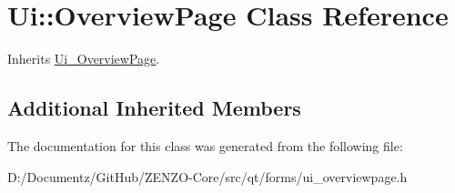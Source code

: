 \hypertarget{class_ui_1_1_overview_page}{}\section{Ui\+::Overview\+Page Class Reference}
\label{class_ui_1_1_overview_page}


Inherits \mbox{\hyperlink{class_ui___overview_page}{Ui\+\_\+\+Overview\+Page}}.

\subsection*{Additional Inherited Members}


The documentation for this class was generated from the following file\+:\begin{DoxyCompactItemize}
\item 
D\+:/\+Documentz/\+Git\+Hub/\+Z\+E\+N\+Z\+O-\/\+Core/src/qt/forms/ui\+\_\+overviewpage.\+h\end{DoxyCompactItemize}
